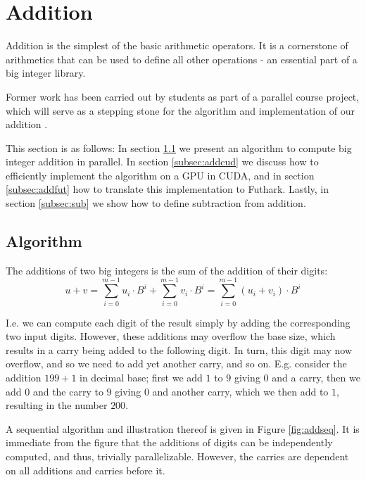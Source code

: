 \section{Addition}
\label{sec:add}

Addition is the simplest of the basic arithmetic operators. It is a cornerstone
of arithmetics that can be used to define all other operations - an essential
part of a big integer library.

Former work has been carried out by students as part of a parallel course
project, which will serve as a stepping stone for the algorithm and
implementation of our addition \cite{DPPproject}.

This section is as follows: In section \ref{subsec:addalg} we present an
algorithm to compute big integer addition in parallel. In section
\ref{subsec:addcud} we discuss how to efficiently implement the algorithm on a
GPU in CUDA, and in section \ref{subsec:addfut} how to translate this
implementation to Futhark. Lastly, in section \ref{subsec:sub} we show how to
define subtraction from addition.

\subsection{Algorithm}
\label{subsec:addalg}

The additions of two big integers is the sum of the addition of their digits:
\begin{equation}
  \label{eq:add}
  u + v = \sum_{i=0}^{m-1}u_i\cdot B^{i} + \sum_{i=0}^{m-1}v_i\cdot B^{i} = \sum_{i=0}^{m-1}(u_i+v_i)\cdot B^{i}
\end{equation}

I.e. we can compute each digit of the result simply by adding the corresponding
two input digits. However, these additions may overflow the base size, which
results in a carry being added to the following digit. In turn, this digit may
now overflow, and so we need to add yet another carry, and so on. E.g. consider
the addition $199 + 1$ in decimal base; first we add $1$ to $9$ giving $0$ and a
carry, then we add $0$ and the carry to $9$ giving $0$ and another carry, which
we then add to $1$, resulting in the number $200$.

A sequential algorithm and illustration thereof is given in Figure
\ref{fig:addseq}. It is immediate from the figure that the additions of digits
can be independently computed, and thus, trivially parallelizable. However, the
carries are dependent on all additions and carries before it.

